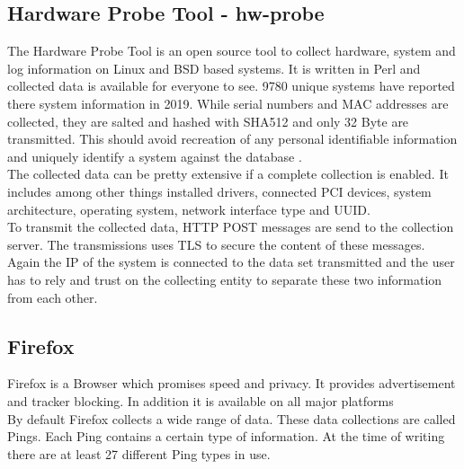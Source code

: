     \subsection{Hardware Probe Tool - hw-probe}
        The Hardware Probe Tool is an open source tool to collect hardware, system and log information on Linux and BSD based systems. It is written in Perl and collected data is available for everyone to see. 9780 unique systems have reported there system information in 2019\cite{ponomarenko_linux_nodate}.
        While serial numbers and MAC addresses are collected, they are salted and hashed with SHA512 and only 32 Byte are transmitted. 
        This should avoid recreation of any personal identifiable information and uniquely identify a system against the database \cite{project_linuxhwhw-probe_2020}.\\
        The collected data can be pretty extensive if a complete collection is enabled. It includes among other things installed drivers, connected PCI devices, system architecture, operating system, network interface type and UUID\cite{project_linuxhwhw-probe_2020}.\\
        
        To transmit the collected data, HTTP POST messages are send to the collection server. The transmissions uses TLS to secure the content of these messages\cite{project_linuxhwhw-probe_2020}.\\
        Again the IP of the system is connected to the data set transmitted and the user has to rely and trust on the collecting entity to separate these two information from each other.\\
    


\newpage
    \subsection{Firefox}
        Firefox is a Browser which promises speed and privacy. It provides advertisement and tracker blocking. In addition it is available on all major platforms\\ 
        By default Firefox collects a wide range of data. These data collections are called Pings. Each Ping contains a certain type of information. At the time of writing there are at least 27 different Ping types in use\cite{mozilla_telemetry_nodate}.
        
